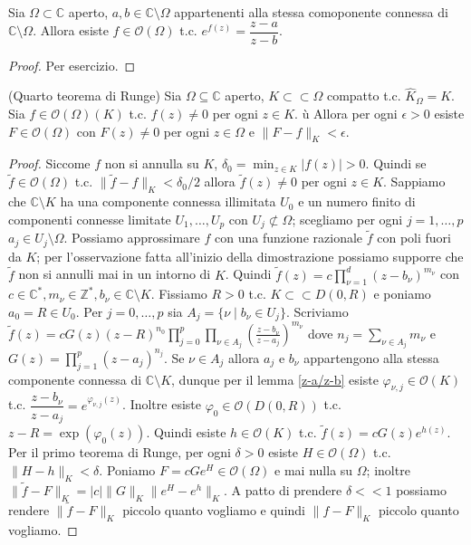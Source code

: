 \begin{lm} \label{z-a/z-b}
  Sia $\Omega \subset \mathbb{C}$ aperto, $a, b \in \mathbb{C}\setminus\Omega$ appartenenti alla stessa comoponente connessa di $\mathbb{C}\setminus\Omega$. Allora esiste $f \in \mathcal{O}(\Omega)$ t.c. $e^{f(z)}=\dfrac{z-a}{z-b}$.
\end{lm}

\begin{proof}
  Per esercizio.
\end{proof}

\begin{thm}
  (Quarto teorema di Runge) Sia $\Omega \subseteq \mathbb{C}$ aperto, $K\subset\subset\Omega$ compatto t.c. $\widehat{K}_{\Omega}=K$. Sia $f \in \mathcal{O}(\Omega)(K)$ t.c. $f(z) \not=0$ per ogni $z \in K$. ù
  Allora per ogni $\epsilon>0$ esiste $F \in \mathcal{O}(\Omega)$ con $F(z) \not=0$ per ogni $z \in \Omega$ e $\|F-f\|_K<\epsilon$.
\end{thm}

\begin{proof}
  Siccome $f$ non si annulla su $K$, $\displaystyle \delta_0=\min_{z \in K} |f(z)|>0$. Quindi se $\tilde{f} \in \mathcal{O}(\Omega)$ t.c. $\|\tilde{f}-f\|_K<\delta_0/2$ allora $\tilde{f}(z)\not=0$ per ogni $z \in K$.
  Sappiamo che $\mathbb{C}\setminus K$ ha una componente connessa illimitata $U_0$ e un numero finito di componenti connesse limitate $U_1, \dots, U_p$ con $U_j \not\subset \Omega$; scegliamo per ogni $j=1, \dots, p$ $a_j \in U_j \setminus \Omega$. Possiamo approssimare $f$ con una funzione razionale $\tilde{f}$ con poli fuori da $K$; per l'osservazione fatta all'inizio della dimostrazione possiamo supporre che $\tilde{f}$ non si annulli mai in un intorno di $K$.
  Quindi $\displaystyle \tilde{f}(z)=c\prod_{\nu=1}^d (z-b_{\nu})^{m_{\nu}}$ con $c \in \mathbb{C}^*, m_{\nu} \in \mathbb{Z}^*, b_{\nu} \in \mathbb{C}\setminus K$. Fissiamo $R>0$ t.c. $K \subset\subset D(0,R)$ e poniamo $a_0=R \in U_0$.
  Per $j=0, \dots, p$ sia $A_j=\{\nu \mid b_{\nu} \in U_j\}$.
  Scriviamo $\displaystyle \tilde{f}(z)=cG(z)(z-R)^{n_0} \prod_{j=0}^p \prod_{\nu \in A_j} \left(\frac{z-b_{\nu}}{z-a_j}\right)^{m_{\nu}}$ dove $\displaystyle n_{j}=\sum_{\nu \in A_j} m_{\nu}$ e $\displaystyle G(z)=\prod_{j=1}^p (z-a_j)^{n_j}$.
  Se $\nu \in A_j$ allora $a_j$ e $b_{\nu}$ appartengono alla stessa componente connessa di $\mathbb{C} \setminus K$, dunque per il lemma \ref{z-a/z-b} esiste $\varphi_{\nu, j} \in \mathcal{O}(K)$ t.c. $\dfrac{z-b_{\nu}}{z-a_j}=e^{\varphi_{\nu, j}(z)}$.
  Inoltre esiste $\varphi_0 \in \mathcal{O}(D(0, R))$ t.c. $z-R=\exp(\varphi_0(z))$. Quindi esiste $h \in \mathcal{O}(K)$ t.c. $\tilde{f}(z)=cG(z)e^{h(z)}$. Per il primo teorema di Runge, per ogni $\delta>0$ esiste $H \in \mathcal{O}(\Omega)$ t.c. $\|H-h\|_K<\delta$.
  Poniamo $F=cGe^H \in \mathcal{O}(\Omega)$ e mai nulla su $\Omega$; inoltre $\|\tilde{f}-F\|_K=|c|\|G\|_K\|e^H-e^h\|_K$. A patto di prendere $\delta<<1$ possiamo rendere $\|\tilde{f}-F\|_K$ piccolo quanto vogliamo e quindi $\|f-F\|_K$ piccolo quanto vogliamo.
\end{proof}

